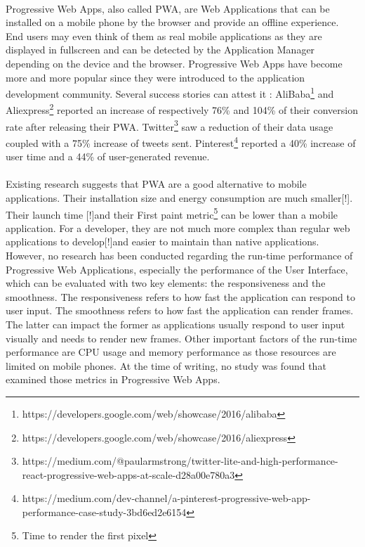 \documentclass{kththesis}
\newcommand{\citationneeded}{\todo{Citation needed}[!]}
\begin{document}
\paragraph{}
Progressive Web Apps, also called PWA, are Web Applications that can be installed on a mobile phone by the browser and provide an offline experience. End users may even think of them as real mobile applications as they are displayed in fullscreen and can be detected by the Application Manager depending on the device and the browser.
Progressive Web Apps have become more and more popular since they were introduced to the application development community. Several success stories can attest it : AliBaba\footnote{https://developers.google.com/web/showcase/2016/alibaba} and Aliexpress\footnote{https://developers.google.com/web/showcase/2016/aliexpress} reported an increase of respectively 76\% and 104\% of their conversion rate after releasing their PWA. Twitter\footnote{https://medium.com/@paularmstrong/twitter-lite-and-high-performance-react-progressive-web-apps-at-scale-d28a00e780a3} saw a reduction of their data usage coupled with a 75\% increase of tweets sent. Pinterest\footnote{https://medium.com/dev-channel/a-pinterest-progressive-web-app-performance-case-study-3bd6ed2e6154} reported a 40\% increase of user time and a 44\% of user-generated revenue.

\paragraph{}
Existing research suggests that PWA are a good alternative to mobile applications. Their installation size and energy consumption are much smaller\citationneeded. Their launch time \citationneeded and their First paint metric\footnote{Time to render the first pixel} can be lower than a mobile application. For a developer, they are not much more complex than regular web applications to develop\citationneeded and easier to maintain than native applications. \newline
\indent
However, no research has been conducted regarding the run-time performance of Progressive Web Applications, especially the performance of the User Interface, which can be evaluated with two key elements: the responsiveness and the smoothness. The responsiveness refers to how fast the application can respond to user input. The smoothness refers to how fast the application can render frames. The latter can impact the former as applications usually respond to user input visually and needs to render new frames. Other important factors of the run-time performance are CPU usage and memory performance as those resources are limited on mobile phones. At the time of writing, no study was found that examined those metrics in Progressive Web Apps.
\end{document}
